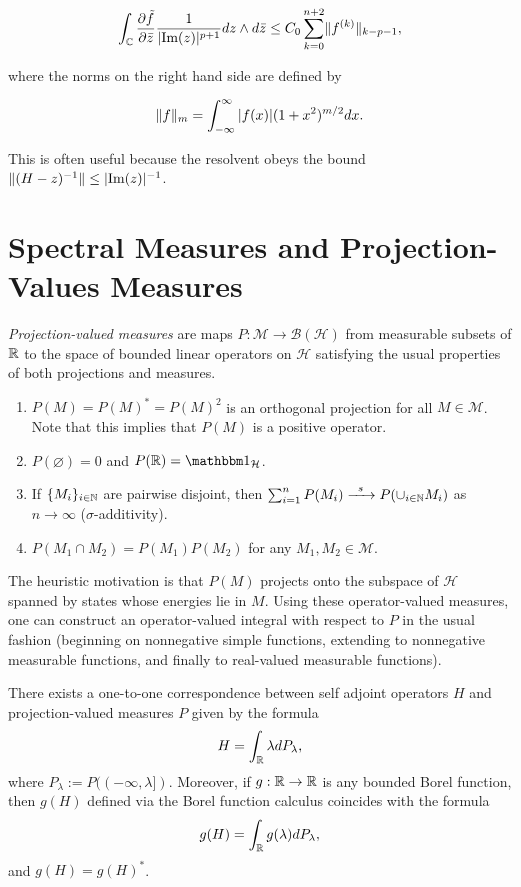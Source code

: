 \documentclass[12pt, letterpaper]{article}
\begin{document}
\[\int_{\mathbb{C}}\frac{\partial \tilde{f}}{\partial \bar{z}} \frac{1}{|\text{Im}(z)|^{p+1}}dz\wedge d\bar{z} \leq C_0 \sum_{k=0}^{n+2 }\lVert f^{(k)} \rVert_{k-p-1},\]

where the norms on the right hand side are defined by 

\[\lVert f \rVert_{m} = \int_{-\infty}^\infty |f(x)|(1+x^2)^{m/2}dx.\]

This is often useful because the resolvent obeys the bound $\lVert (H-z)^{-1} \rVert \leq |\text{Im}(z)|^{-1}$.

\section{Spectral Measures and Projection-Values Measures}\label{sec:pvm}

\emph{Projection-valued measures} are maps $P:\mathcal{M}\to\mathcal{B}(\mathcal{H})$ from measurable subsets of $\mathbb{R}$ to the space of bounded linear operators on $\mathcal{H}$ satisfying the usual properties of both projections and measures.

\begin{enumerate}
\item $P(M)=P(M)^*=P(M)^2$ is an orthogonal projection for all $M\in\mathcal{M}$. Note that this implies that $P(M)$ is a positive operator.
\item $P(\varnothing)=0$ and $P(\R)=\One_\mathcal{H}$.
\item If $\{M_i\}_{i\in\mathbb{N}}$ are pairwise disjoint, then $\sum_{i=1}^n P(M_i) \xrightarrow{\enskip s \enskip}P(\cup_{i\in\mathbb{N}} M_i)$ as $n\to\infty$ ($\sigma$-additivity).
\item $P(M_1\cap M_2) = P(M_1)P(M_2)$ for any $M_1,M_2\in\mathcal{M}$.
\end{enumerate}

The heuristic motivation is that $P(M)$ projects onto the subspace of $\mathcal{H}$ spanned by states whose energies lie in $M$. Using these operator-valued measures, one can construct an operator-valued integral with respect to $P$ in the usual fashion (beginning on nonnegative simple functions, extending to nonnegative measurable functions, and finally to real-valued measurable functions). 

\begin{theorem}
There exists a one-to-one correspondence between self adjoint operators $H$ and projection-valued measures $P$ given by the formula
\[H = \int_{\mathbb{R}} \lambda dP_\lambda,\]
where $P_\lambda := P((-\infty,\lambda])$. Moreover, if $g:\mathbb{R}\to\mathbb{R}$ is any bounded Borel function, then $g(H)$ defined via the Borel function calculus coincides with the formula
\[g(H) = \int_{\mathbb{R}} g(\lambda) dP_\lambda,\]
and $g(H) = g(H)^*$.
\label{thm:spectraltheorem}
\end{theorem}
\end{document}
